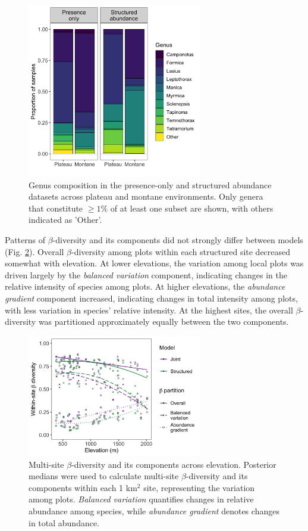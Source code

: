 \documentclass[preprint,review,times,12pt]{elsarticle}
\begin{document}
\begin{figure}
	\centering\includegraphics[width=3in]{ms/1_Ecography/1/figs/genus_assemblages.png}
	\caption{\label{fig:genus_assemblages} Genus composition in the presence-only and structured abundance datasets across plateau and montane environments. Only genera that constitute $\geq 1\%$ of at least one subset are shown, with others indicated as 'Other'.}
\end{figure}

Patterns of $\beta$-diversity and its components did not strongly differ between models (Fig. \ref{fig:beta_div}). Overall $\beta$-diversity among plots within each structured site decreased somewhat with elevation. At lower elevations, the variation among local plots was driven largely by the \emph{balanced variation} component, indicating changes in the relative intensity of species among plots. At higher elevations, the \emph{abundance gradient} component increased, indicating changes in total intensity among plots, with less variation in species' relative intensity. At the highest sites, the overall $\beta$-diversity was partitioned approximately equally between the two components.

\begin{figure}
\centering\includegraphics[width=3in]{ms/1_Ecography/1/figs/beta_diversity.png}
\caption{\label{fig:beta_div} Multi-site $\beta$-diversity and its components across elevation. Posterior medians were used to calculate multi-site $\beta$-diversity and its components within each 1 km$^2$ site, representing the variation among plots. \emph{Balanced variation} quantifies changes in relative abundance among species, while \emph{abundance gradient} denotes changes in total abundance.}
\end{figure}
\end{document}
